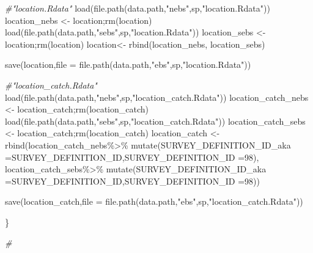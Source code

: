 \documentclass[
]{article}
\newenvironment{Shaded}{\begin{snugshade}}{\end{snugshade}}
\newcommand{\AttributeTok}[1]{\textcolor[rgb]{0.77,0.63,0.00}{#1}}
\newcommand{\CommentTok}[1]{\textcolor[rgb]{0.56,0.35,0.01}{\textit{#1}}}
\newcommand{\DecValTok}[1]{\textcolor[rgb]{0.00,0.00,0.81}{#1}}
\newcommand{\FunctionTok}[1]{\textcolor[rgb]{0.00,0.00,0.00}{#1}}
\newcommand{\NormalTok}[1]{#1}
\newcommand{\OtherTok}[1]{\textcolor[rgb]{0.56,0.35,0.01}{#1}}
\newcommand{\SpecialCharTok}[1]{\textcolor[rgb]{0.00,0.00,0.00}{#1}}
\newcommand{\StringTok}[1]{\textcolor[rgb]{0.31,0.60,0.02}{#1}}
\begin{document}
\begin{Shaded}
\begin{Highlighting}[]
    \CommentTok{\#"location.Rdata"        }
    \FunctionTok{load}\NormalTok{(}\FunctionTok{file.path}\NormalTok{(data.path,}\StringTok{"nebs"}\NormalTok{,sp,}\StringTok{"location.Rdata"}\NormalTok{))}
\NormalTok{    location\_nebs }\OtherTok{\textless{}{-}}\NormalTok{ location;}\FunctionTok{rm}\NormalTok{(location)}
    \FunctionTok{load}\NormalTok{(}\FunctionTok{file.path}\NormalTok{(data.path,}\StringTok{"sebs"}\NormalTok{,sp,}\StringTok{"location.Rdata"}\NormalTok{))}
\NormalTok{    location\_sebs }\OtherTok{\textless{}{-}}\NormalTok{ location;}\FunctionTok{rm}\NormalTok{(location)}
\NormalTok{    location}\OtherTok{\textless{}{-}} \FunctionTok{rbind}\NormalTok{(location\_nebs, location\_sebs)}
    
    \FunctionTok{save}\NormalTok{(location,}\AttributeTok{file =} \FunctionTok{file.path}\NormalTok{(data.path,}\StringTok{"ebs"}\NormalTok{,sp,}\StringTok{"location.Rdata"}\NormalTok{))}
    
    
    \CommentTok{\#"location\_catch.Rdata"}
    \FunctionTok{load}\NormalTok{(}\FunctionTok{file.path}\NormalTok{(data.path,}\StringTok{"nebs"}\NormalTok{,sp,}\StringTok{"location\_catch.Rdata"}\NormalTok{))}
\NormalTok{    location\_catch\_nebs }\OtherTok{\textless{}{-}}\NormalTok{ location\_catch;}\FunctionTok{rm}\NormalTok{(location\_catch)}
    \FunctionTok{load}\NormalTok{(}\FunctionTok{file.path}\NormalTok{(data.path,}\StringTok{"sebs"}\NormalTok{,sp,}\StringTok{"location\_catch.Rdata"}\NormalTok{))}
\NormalTok{    location\_catch\_sebs }\OtherTok{\textless{}{-}}\NormalTok{ location\_catch;}\FunctionTok{rm}\NormalTok{(location\_catch)}
\NormalTok{    location\_catch }\OtherTok{\textless{}{-}} \FunctionTok{rbind}\NormalTok{(location\_catch\_nebs}\SpecialCharTok{\%\textgreater{}\%}
      \FunctionTok{mutate}\NormalTok{(}\AttributeTok{SURVEY\_DEFINITION\_ID\_aka =}\NormalTok{SURVEY\_DEFINITION\_ID,}\AttributeTok{SURVEY\_DEFINITION\_ID =}\DecValTok{98}\NormalTok{),}
\NormalTok{     location\_catch\_sebs}\SpecialCharTok{\%\textgreater{}\%}
      \FunctionTok{mutate}\NormalTok{(}\AttributeTok{SURVEY\_DEFINITION\_ID\_aka =}\NormalTok{SURVEY\_DEFINITION\_ID,}\AttributeTok{SURVEY\_DEFINITION\_ID =}\DecValTok{98}\NormalTok{))}
    
    \FunctionTok{save}\NormalTok{(location\_catch,}\AttributeTok{file =} \FunctionTok{file.path}\NormalTok{(data.path,}\StringTok{"ebs"}\NormalTok{,sp,}\StringTok{"location\_catch.Rdata"}\NormalTok{))}
    
\NormalTok{  \}}

    
\CommentTok{\#\textasciigrave{}\textasciigrave{}\textasciigrave{}}



\end{Highlighting}
\end{Shaded}
\end{document}
